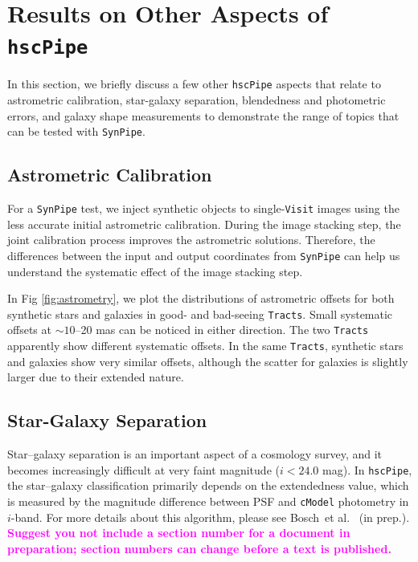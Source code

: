 \documentclass[useamsfonts]{pasj01}
\def\etal{{\ et al.~}}
\def\hscpipe{\texttt{hscPipe}}
\def\synpipe{\texttt{SynPipe}}
\def\cmodel{\texttt{cModel}}
\def\visit{\texttt{Visit}}
\def\tracts{\texttt{Tracts}}
\newcommand{\susan}[1]{\textcolor{magenta} {\textbf{#1}}}
\begin{document}

\section{Results on Other Aspects of \hscpipe{}}
    \label{sec:others}

    In this section, we briefly discuss a few other  \hscpipe{} aspects that relate 
    to astrometric calibration, star-galaxy separation, blendedness and photometric errors, and galaxy shape measurements to demonstrate the range of topics that can be tested with \synpipe{}.
    
\subsection{Astrometric Calibration}
    \label{ssec:astrometry}
    
    For a \synpipe{} test, we inject synthetic objects to single-\visit{} images using 
    the less accurate initial astrometric calibration. 
    During the image stacking step, the joint calibration process  improves the 
    astrometric solutions. 
    Therefore, the differences between the input and output coordinates from \synpipe{}
    can help us understand the systematic effect of the image stacking step. 
    
    In Fig \ref{fig:astrometry}, we plot the distributions of astrometric offsets for 
    both synthetic stars and galaxies in good- and bad-seeing \tracts{}. 
    Small systematic offsets at ${\sim}10$--20 mas can be noticed in either direction. 
    The two \tracts{} apparently show different systematic offsets. 
    In the same \tracts{}, synthetic stars and galaxies show very similar offsets, 
    although the scatter for galaxies is slightly larger due to their extended nature.
    
\subsection{Star-Galaxy Separation}
    \label{ssec:sg}
    
    Star--galaxy separation is an important aspect of a cosmology survey,
    and it becomes increasingly difficult at very faint magnitude ($i<24.0$ mag). 
    In \hscpipe{}, the star--galaxy classification primarily depends on the extendedness 
    value, which is measured by the magnitude difference between PSF and \cmodel{} 
    photometry in $i$-band. 
    For more details about this algorithm, please see Bosch\etal 
    (in prep.). \susan{Suggest you not include a section number for a document in preparation; section numbers can change before a text is published. }
    
\end{document}
